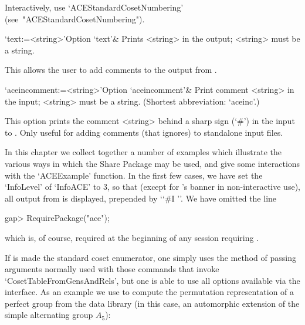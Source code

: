 Interactively,             use             `ACEStandardCosetNumbering'
(see~"ACEStandardCosetNumbering").

\enditems


\beginitems

\>`text:=<string>'{Option `text'}&
Prints <string> in the output; <string> must be a string.

This allows the user to add comments to the output from {\ACE}.

\>`aceincomment:=<string>'{Option `aceincomment'}&
Print comment <string> in the {\ACE} input; <string> must be a string.
(Shortest abbreviation: `aceinc'.)

This option prints the comment <string> behind a sharp sign (`\#')  in
the input to {\ACE}. Only useful  for  adding  comments  (that  {\ACE}
ignores) to standalone input files.

\enditems


In this chapter  we  collect  together  a  number  of  examples  which
illustrate the various ways in which the {\ACE} Share Package  may  be
used, and give some interactions with the  `ACEExample'  function.  In
the first few cases, we have set the `InfoLevel' of `InfoACE' to 3, so
that (except for {\ACE}'s banner in non-interactive use),  all  output
from {\ACE} is displayed, prepended by \lq{}`\#I ''. We  have  omitted
the line

\beginexample
gap> RequirePackage("ace");
\endexample

which is,  of  course,  required  at  the  beginning  of  any  session
requiring {\ACE}.


If {\ACE} is made the standard coset enumerator, one simply  uses  the
method of passing arguments normally used  with  those  commands  that
invoke `CosetTableFromGensAndRels', but one is able to use all options
available via the {\ACE} interface. As an example  we  use  {\ACE}  to
compute the permutation representation of a  perfect  group  from  the
data library (in this case, an automorphic  extension  of  the  simple
alternating group $A_5$):

